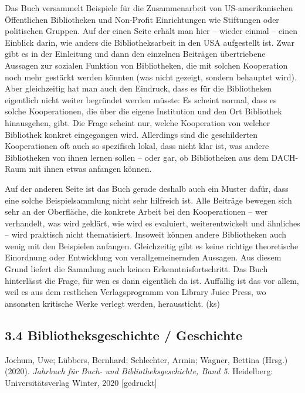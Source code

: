 \documentclass[a4paper,
fontsize=11pt,
oneside,
numbers=noperiodatend,
parskip=half-,
bibliography=totoc,
final
]{scrartcl}
\begin{document}
Das Buch versammelt Beispiele für die Zusammenarbeit von
US-amerikanischen Öffentlichen Bibliotheken und Non-Profit Einrichtungen
wie Stiftungen oder politischen Gruppen. Auf der einen Seite erhält man
hier -- wieder einmal -- einen Einblick darin, wie anders die
Bibliotheksarbeit in den USA aufgestellt ist. Zwar gibt es in der
Einleitung und dann den einzelnen Beiträgen übertriebene Aussagen zur
sozialen Funktion von Bibliotheken, die mit solchen Kooperation noch
mehr gestärkt werden könnten (was nicht gezeigt, sondern behauptet
wird). Aber gleichzeitig hat man auch den Eindruck, dass es für die
Bibliotheken eigentlich nicht weiter begründet werden müsste: Es scheint
normal, dass es solche Kooperationen, die über die eigene Institution
und den Ort Bibliothek hinausgehen, gibt. Die Frage scheint nur, welche
Kooperation von welcher Bibliothek konkret eingegangen wird. Allerdings
sind die geschilderten Kooperationen oft auch so spezifisch lokal, dass
nicht klar ist, was andere Bibliotheken von ihnen lernen sollen -- oder
gar, ob Bibliotheken aus dem DACH-Raum mit ihnen etwas anfangen können.

Auf der anderen Seite ist das Buch gerade deshalb auch ein Muster dafür,
dass eine solche Beispielsammlung nicht sehr hilfreich ist. Alle
Beiträge bewegen sich sehr an der Oberfläche, die konkrete Arbeit bei
den Kooperationen -- wer verhandelt, was wird geklärt, wie wird es
evaluiert, weiterentwickelt und ähnliches -- wird praktisch nicht
thematisiert. Insoweit können andere Bibliotheken auch wenig mit den
Beispielen anfangen. Gleichzeitig gibt es keine richtige theoretische
Einordnung oder Entwicklung von verallgemeinernden Aussagen. Aus diesem
Grund liefert die Sammlung auch keinen Erkenntnisfortschritt. Das Buch
hinterlässt die Frage, für wen es dann eigentlich da ist. Auffällig ist
das vor allem, weil es aus dem restlichen Verlagsprogramm von Library
Juice Press, wo ansonsten kritische Werke verlegt werden, heraussticht.
(ks)

\hypertarget{bibliotheksgeschichte-geschichte}{%
\subsection{3.4 Bibliotheksgeschichte /
Geschichte}\label{bibliotheksgeschichte-geschichte}}

Jochum, Uwe; Lübbers, Bernhard; Schlechter, Armin; Wagner, Bettina
(Hrsg.) (2020). \emph{Jahrbuch für Buch- und Bibliotheksgeschichte, Band
5}. Heidelberg: Universitätsverlag Winter, 2020 {[}gedruckt{]}
\end{document}
